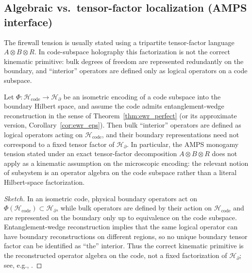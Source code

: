 \subsection{Algebraic vs.\ tensor-factor localization (AMPS interface)}
The firewall tension is usually stated using a tripartite tensor-factor language $A\otimes B\otimes R$. In code-subspace holography this factorization is not the correct kinematic primitive: bulk degrees of freedom are represented redundantly on the boundary, and ``interior'' operators are defined only as logical operators on a code subspace.

\begin{proposition}
\label{prop:no_naive_factorization_code}
Let $\Phi:\mathcal{H}_{\mathrm{code}}\to\mathcal{H}_{\partial}$ be an isometric encoding of a code subspace into the boundary Hilbert space, and assume the code admits entanglement-wedge reconstruction in the sense of Theorem~\ref{thm:ewr_perfect} (or its approximate version, Corollary~\ref{cor:ewr_eps}).
Then bulk ``interior'' operators are defined as logical operators acting on $\mathcal{H}_{\mathrm{code}}$, and their boundary representations need not correspond to a fixed tensor factor of $\mathcal{H}_{\partial}$.
In particular, the AMPS monogamy tension stated under an exact tensor-factor decomposition $A\otimes B\otimes R$ does not apply as a kinematic assumption on the microscopic encoding: the relevant notion of subsystem is an operator algebra on the code subspace rather than a literal Hilbert-space factorization.
\end{proposition}
\begin{proof}[Sketch]
In an isometric code, physical boundary operators act on $\Phi(\mathcal{H}_{\mathrm{code}})\subset \mathcal{H}_{\partial}$, while bulk operators are defined by their action on $\mathcal{H}_{\mathrm{code}}$ and are represented on the boundary only up to equivalence on the code subspace.
Entanglement-wedge reconstruction implies that the same logical operator can have boundary reconstructions on different regions, so no unique boundary tensor factor can be identified as ``the'' interior.
Thus the correct kinematic primitive is the reconstructed operator algebra on the code, not a fixed factorization of $\mathcal{H}_{\partial}$; see, e.g., \cite{AlmheiriDongHarlow2015,Harlow2017}.
\end{proof}

